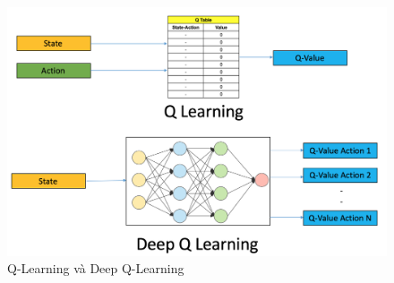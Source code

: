 \begin{center}
    \begin{figure}[h!]
        \begin{center}
         \includegraphics[scale=0.27]{chapter3/img/dqlearning.png}
        \end{center}
        \caption{Q-Learning và Deep Q-Learning}
        \label{fig:dqlearning}
    \end{figure}
\end{center}

